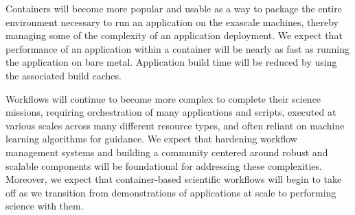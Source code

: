 Containers will become more popular and usable as a way to package the entire 
environment necessary to run an application on the exascale machines, thereby managing some of the 
complexity of an application deployment.  We expect that performance of an application within a 
container will be nearly as fast as running the application on bare metal.  Application
build time will be reduced by using the associated build caches.

Workflows will continue to become more complex to complete their science missions, requiring
orchestration of many applications and scripts, executed at various scales across many 
different resource types, and often reliant on machine learning algorithms for guidance.
We expect that hardening workflow management systems and building a community centered
around robust and scalable components will be foundational for addressing these
complexities.  Moreover, we expect that container-based scientific workflows will 
begin to take off as we transition from demonstrations of applications at scale 
to performing science with them.

